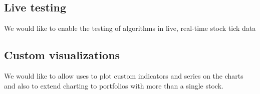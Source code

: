 \documentclass[10pt, conference, compsocconf]{IEEEtran}
\begin{document}
\subsection{Live testing}
We would like to enable the testing of algorithms in live, real-time stock tick data
\subsection{Custom visualizations}
We would like to allow uses to plot custom indicators and series on the charts and also to extend charting to portfolios with more than a single stock.

%
%



%
%
\end{document}
